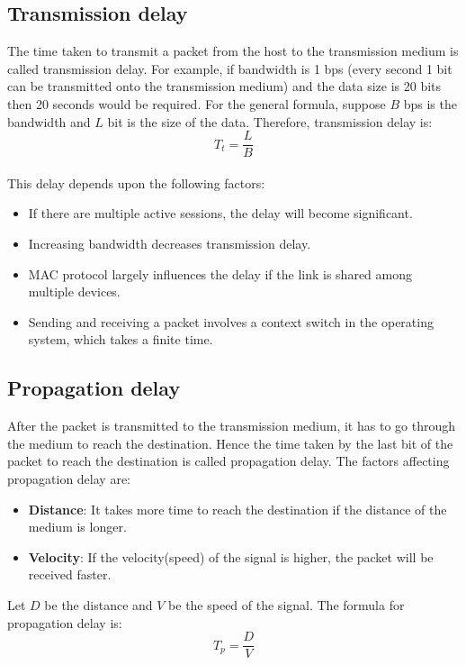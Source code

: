 \documentclass{article}
\begin{document}
    \subsection{Transmission delay} The time taken to transmit a packet from the host to the transmission medium is called transmission delay. For example, if bandwidth is 1 bps (every second 1 bit can be transmitted onto the transmission medium) and the data size is 20 bits then 20 seconds would be required. 
    For the general formula, suppose $ B $ bps is the bandwidth and $L$ bit is the size of the data. Therefore, transmission delay is:
    \begin{equation}
        T_t = \frac{L}{B}
    \end{equation}
    ~\\This delay depends upon the following factors:
    \begin{itemize}
        \item If there are multiple active sessions, the delay will become significant.
        \item Increasing bandwidth decreases transmission delay.
        \item MAC protocol largely influences the delay if the link is shared among multiple devices.
        \item Sending and receiving a packet involves a context switch in the operating system, which takes a finite time.
    \end{itemize}
    
    \subsection{Propagation delay}
    After the packet is transmitted to the transmission medium, it has to go through the medium to reach the destination. Hence the time taken by the last bit of the packet to reach the destination is called propagation delay. 
    The factors affecting propagation delay are:
    \begin{itemize}
        \item \textbf{Distance}: It takes more time to reach the destination if the distance of the medium is longer. 
        \item \textbf{Velocity}: If the velocity(speed) of the signal is higher, the packet will be received faster.
    \end{itemize}
    Let $D$ be the distance and $V$ be the speed of the signal. The formula for propagation delay is:
    \begin{equation}
        T_p = \frac{D}{V} 
    \end{equation}
    
\end{document}
